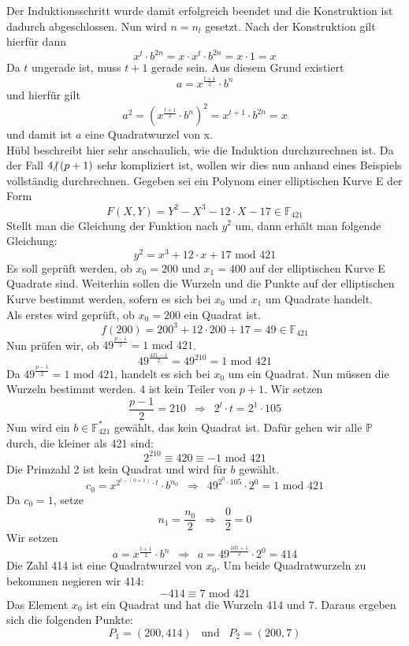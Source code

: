 Der Induktionsschritt wurde damit erfolgreich beendet und die Konstruktion ist dadurch abgeschlossen. Nun wird $n = n_l$ gesetzt. Nach der Konstruktion gilt hierfür dann $$x^t \cdot b^{2n} = x \cdot x^t \cdot b^{2n} = x \cdot 1 = x$$ Da $t$ ungerade ist, muss $t + 1$ gerade sein. Aus diesem Grund existiert $$a = x^{\frac{t + 1}{2}} \cdot b^n$$ und hierfür gilt $$a^2 = {(x^{\frac{t + 1}{2}} \cdot b^n)}^2 = x^{t + 1} \cdot b^{2n} = x$$ und damit ist $a$ eine Quadratwurzel von x.\\

Hübl beschreibt hier sehr anschaulich, wie die Induktion durchzurechnen ist. Da der Fall $4 \hspace{-0.4em}\not\hspace{0.025em}|\, (p + 1)$ sehr kompliziert ist, wollen wir dies nun anhand eines Beispiels vollständig durchrechnen. Gegeben sei ein Polynom einer elliptischen Kurve E der Form $$F(X, Y) = Y^{2} - X^{3} - 12 \cdot X - 17 \in \mathbb{F}_{421}$$ Stellt man die Gleichung der Funktion nach $y^{2}$ um, dann erhält man folgende Gleichung: $$y^{2} =  x^{3} + 12 \cdot x + 17 \text{ mod }421$$ Es soll geprüft werden, ob $x_0 = 200$ und $x_1 = 400$ auf der elliptischen Kurve E Quadrate sind. Weiterhin sollen die Wurzeln und die Punkte auf der elliptischen Kurve bestimmt werden, sofern es sich bei $x_0$ und $x_1$ um Quadrate handelt.\\

Als erstes wird geprüft, ob $x_0 = 200$ ein Quadrat ist. $$f(200) =  200^{3} + 12 \cdot 200 + 17 = 49 \in \mathbb{F}_{421}$$ Nun prüfen wir, ob $49^{\frac{p - 1}{2}} = 1 \text{ mod } 421$. $$49^{\frac{421 - 1}{2}} = 49^210 = 1 \text{ mod } 421$$ Da $49^{\frac{p - 1}{2}} = 1 \text{ mod } 421$, handelt es sich bei $x_0$ um ein Quadrat. Nun müssen die Wurzeln bestimmt werden. 4 ist kein Teiler von $p + 1$. Wir setzen $$\frac{p - 1}{2} = 210 \enspace \Longrightarrow \enspace 2^l \cdot t = 2^1 \cdot 105$$ Nun wird ein $b \in \mathbb{F}_{421}^*$ gewählt, das kein Quadrat ist. Dafür gehen wir alle $\mathbb{P}$ durch, die kleiner als 421 sind: $$2^210 \equiv 420 \equiv - 1 \text{ mod } 421$$ Die Primzahl 2 ist kein Quadrat und wird für $b$ gewählt. $$c_0 = x^{2^{l - (0 + 1)} \cdot t} \cdot b^{n_0} \enspace \Longrightarrow \enspace 49^{2^{0} \cdot 105} \cdot 2^0 = 1 \text{ mod } 421$$ Da $c_0 = 1$, setze $$n_{1} = \frac{n_0}{2} \enspace \Longrightarrow \enspace \frac{0}{2} = 0$$ Wir setzen $$a = x^{\frac{t + 1}{2}} \cdot b^n  \enspace \Longrightarrow \enspace a = 49^{\frac{105 + 1}{2}} \cdot 2^0 = 414$$ Die Zahl 414 ist eine Quadratwurzel von $x_0$. Um beide Quadratwurzeln zu bekommen negieren wir 414: $$- 414 \equiv 7 \text{ mod } 421$$ Das Element $x_0$ ist ein Quadrat und hat die Wurzeln 414 und 7. Daraus ergeben sich die folgenden Punkte: $$P_1 = (200, 414) \enspace \text{ und } \enspace P_2 = (200, 7)$$

